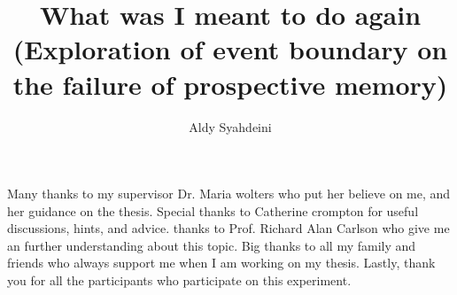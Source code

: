 \documentclass[msc,frontabs,logo,twoside,deptreport]{infthesis}
\title{What was I meant to do again (Exploration of event boundary on the failure of prospective memory)}
\author{Aldy Syahdeini}
\begin{document}
\begin{preliminary}

\maketitle

\begin{acknowledgements}
Many thanks to my supervisor Dr. Maria wolters who put her believe on me, and her guidance
on the thesis.
Special thanks to Catherine crompton for useful discussions, hints, and
advice.
thanks to Prof. Richard Alan Carlson who give me an further understanding about this topic.
Big thanks to all my family and friends who always support me when I am working on my thesis.
Lastly, thank you for all the participants who participate on this experiment.


\end{acknowledgements}

\standarddeclaration


\tableofcontents


\end{preliminary}









% 

\appendix












\end{document}
